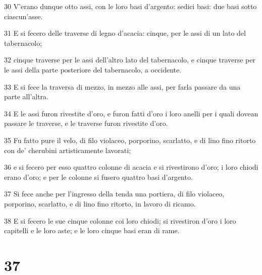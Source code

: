 \par 30 V'erano dunque otto assi, con le loro basi d'argento: sedici basi: due basi sotto ciascun'asse.
\par 31 E si fecero delle traverse di legno d'acacia: cinque, per le assi di un lato del tabernacolo;
\par 32 cinque traverse per le assi dell'altro lato del tabernacolo, e cinque traverse per le assi della parte posteriore del tabernacolo, a occidente.
\par 33 E si fece la traversa di mezzo, in mezzo alle assi, per farla passare da una parte all'altra.
\par 34 E le assi furon rivestite d'oro, e furon fatti d'oro i loro anelli per i quali dovean passare le traverse, e le traverse furon rivestite d'oro.
\par 35 Fu fatto pure il velo, di filo violaceo, porporino, scarlatto, e di lino fino ritorto con de' cherubini artisticamente lavorati;
\par 36 e si fecero per esso quattro colonne di acacia e si rivestirono d'oro; i loro chiodi erano d'oro; e per le colonne si fusero quattro basi d'argento.
\par 37 Si fece anche per l'ingresso della tenda una portiera, di filo violaceo, porporino, scarlatto, e di lino fino ritorto, in lavoro di ricamo.
\par 38 E si fecero le sue cinque colonne coi loro chiodi; si rivestiron d'oro i loro capitelli e le loro aste; e le loro cinque basi eran di rame.

\chapter{37}


